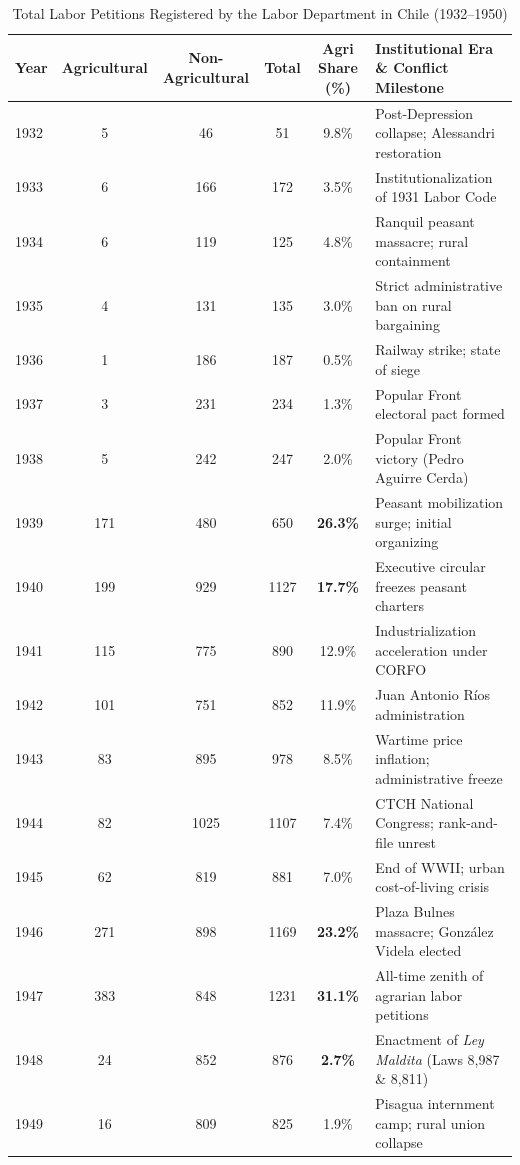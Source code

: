 \begin{table}[htbp]
\centering
\small
\caption{Total Labor Petitions Registered by the Labor Department in Chile (1932--1950)}
\label{tab:labor_petitions_1932_1950}
\begin{tabularx}{\textwidth}{lccccX}
\toprule
\textbf{Year} & \textbf{Agricultural} & \textbf{Non-Agricultural} & \textbf{Total} & \textbf{Agri Share (\%)} & \textbf{Institutional Era \& Conflict Milestone} \\
\midrule
1932 & 5 & 46 & 51 & 9.8\% & Post-Depression collapse; Alessandri restoration \\
1933 & 6 & 166 & 172 & 3.5\% & Institutionalization of 1931 Labor Code \\
1934 & 6 & 119 & 125 & 4.8\% & Ranquil peasant massacre; rural containment \\
1935 & 4 & 131 & 135 & 3.0\% & Strict administrative ban on rural bargaining \\
1936 & 1 & 186 & 187 & 0.5\% & Railway strike; state of siege \\
1937 & 3 & 231 & 234 & 1.3\% & Popular Front electoral pact formed \\
1938 & 5 & 242 & 247 & 2.0\% & Popular Front victory (Pedro Aguirre Cerda) \\
1939 & 171 & 480 & 650 & \textbf{26.3\%} & Peasant mobilization surge; initial organizing \\
1940 & 199 & 929 & 1127 & \textbf{17.7\%} & Executive circular freezes peasant charters \\
1941 & 115 & 775 & 890 & 12.9\% & Industrialization acceleration under CORFO \\
1942 & 101 & 751 & 852 & 11.9\% & Juan Antonio Ríos administration \\
1943 & 83 & 895 & 978 & 8.5\% & Wartime price inflation; administrative freeze \\
1944 & 82 & 1025 & 1107 & 7.4\% & CTCH National Congress; rank-and-file unrest \\
1945 & 62 & 819 & 881 & 7.0\% & End of WWII; urban cost-of-living crisis \\
1946 & 271 & 898 & 1169 & \textbf{23.2\%} & Plaza Bulnes massacre; González Videla elected \\
1947 & 383 & 848 & 1231 & \textbf{31.1\%} & All-time zenith of agrarian labor petitions \\
1948 & 24 & 852 & 876 & \textbf{2.7\%} & Enactment of \textit{Ley Maldita} (Laws 8,987 \& 8,811) \\
1949 & 16 & 809 & 825 & 1.9\% & Pisagua internment camp; rural union collapse \\

\end{tabularx}
\end{table}
